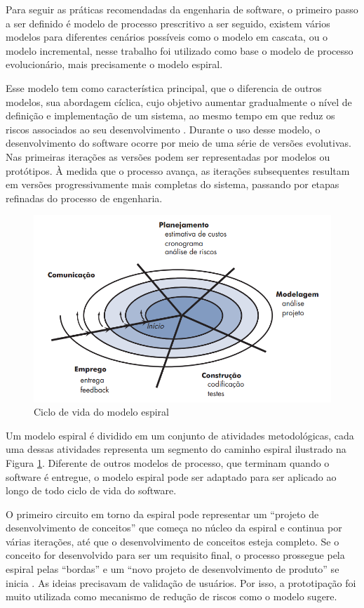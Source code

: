 Para seguir as práticas recomendadas da engenharia de software, o primeiro passo a ser definido é modelo de processo prescritivo a ser seguido, existem vários modelos para diferentes cenários possíveis como o modelo em cascata, ou o modelo incremental, nesse trabalho foi utilizado como base o modelo de processo evolucionário, mais precisamente o modelo espiral.

Esse modelo tem como característica principal, que o diferencia de outros modelos, sua abordagem cíclica, cujo objetivo aumentar gradualmente o nível de definição e implementação de um sistema, ao mesmo tempo em que reduz os riscos associados ao seu desenvolvimento \cite{maxim2021engenharia}. Durante o uso desse modelo, o desenvolvimento do software ocorre por meio de uma série de versões evolutivas. Nas primeiras iterações as versões podem ser representadas por modelos ou protótipos. À medida que o processo avança, as iterações subsequentes resultam em versões progressivamente mais completas do sistema, passando por etapas refinadas do processo de engenharia.

\begin{figure}[h!]
    \centering
    \includegraphics[width=0.9\linewidth]{figuras/spiral-model.png}
    \caption{Ciclo de vida do modelo espiral}
    \label{spiral-model}
\end{figure}
\newpage
Um modelo espiral é dividido em um conjunto de atividades metodológicas, cada uma dessas atividades representa um segmento do caminho espiral ilustrado na Figura \ref{spiral-model}. Diferente de outros modelos de processo, que terminam quando o software é entregue, o modelo espiral pode ser adaptado para ser aplicado ao longo de todo ciclo de vida do software.

O primeiro circuito em torno da espiral pode representar um “projeto de desenvolvimento de conceitos” que começa no núcleo da espiral e continua por várias iterações, até que o desenvolvimento de conceitos esteja completo. Se o conceito for desenvolvido para ser um requisito final, o processo prossegue pela espiral pelas “bordas” e um “novo projeto de desenvolvimento de produto” se inicia \cite{maxim2021engenharia}. As ideias precisavam de validação de usuários. Por isso, a prototipação foi muito utilizada como mecanismo de redução de riscos como o modelo sugere. 

